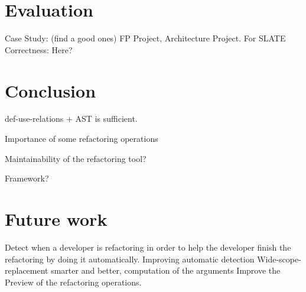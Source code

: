 \section{Evaluation}
Case Study: (find a good ones) FP Project, Architecture Project. For SLATE
Correctness: Here?
\section{Conclusion}
def-use-relations + AST is sufficient.

Importance of some refactoring operations

Maintainability of the refactoring tool?

Framework?
\section{Future work}
Detect when a developer is refactoring in order to help the developer finish the
refactoring by doing it automatically.
Improving automatic detection
Wide-scope-replacement smarter and better, computation of the arguments
Improve the Preview of the refactoring operations.
